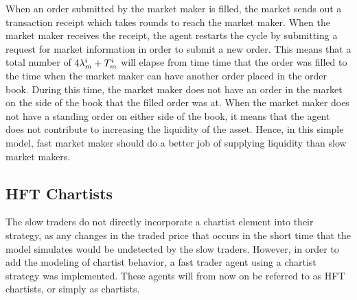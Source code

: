 When an order submitted by the market maker is filled, the market sends out a transaction receipt which takes  rounds to reach the market maker. When the market maker receives the receipt, the agent restarts the cycle by submitting a request for market information in order to submit a new order. This means that a total number of $4\lambda_m^{i} + T_m^{i}$ will elapse from time time that the order was filled to the time when the market maker can have another order placed in the order book. During this time, the market maker does not have an order in the market on the side of the book that the filled order was at. When the market maker does not have a standing order on either side of the book, it means that the agent does not contribute to increasing the liquidity of the asset. Hence, in this simple model, fast market maker should do a better job of supplying liquidity than slow market makers.






\subsection{HFT Chartists}\label{section:hft_chartist}
The slow traders do not directly incorporate a chartist element into their strategy, as any changes in the traded price that occurs in the short time that the model simulates would be undetected by the slow traders. However, in order to add the modeling of chartist behavior, a fast trader agent using a chartist strategy was implemented. These agents will from now on be referred to as HFT chartists, or simply as chartists. 
